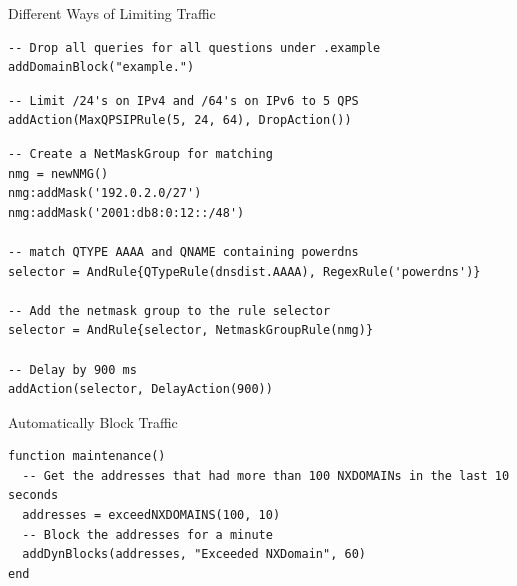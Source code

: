 \documentclass{beamer}
\begin{document}
\begin{frame}{Different Ways of Limiting Traffic}
  \begin{verbatim}
-- Drop all queries for all questions under .example
addDomainBlock("example.")
  \end{verbatim}

  \framebreak

  \begin{verbatim}
-- Limit /24's on IPv4 and /64's on IPv6 to 5 QPS
addAction(MaxQPSIPRule(5, 24, 64), DropAction())
  \end{verbatim}

  \framebreak

  \begin{verbatim}
-- Create a NetMaskGroup for matching
nmg = newNMG()
nmg:addMask('192.0.2.0/27')
nmg:addMask('2001:db8:0:12::/48')

-- match QTYPE AAAA and QNAME containing powerdns
selector = AndRule{QTypeRule(dnsdist.AAAA), RegexRule('powerdns')}

-- Add the netmask group to the rule selector
selector = AndRule{selector, NetmaskGroupRule(nmg)}

-- Delay by 900 ms
addAction(selector, DelayAction(900))
  \end{verbatim}
\end{frame}

\begin{frame}[fragile]{Automatically Block Traffic}
  \begin{verbatim}
function maintenance()
  -- Get the addresses that had more than 100 NXDOMAINs in the last 10 seconds
  addresses = exceedNXDOMAINS(100, 10)
  -- Block the addresses for a minute
  addDynBlocks(addresses, "Exceeded NXDomain", 60)
end
  \end{verbatim}
\end{frame}
\end{document}
